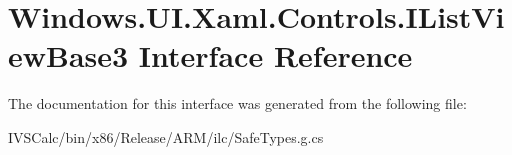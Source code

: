 \hypertarget{interface_windows_1_1_u_i_1_1_xaml_1_1_controls_1_1_i_list_view_base3}{}\section{Windows.\+U\+I.\+Xaml.\+Controls.\+I\+List\+View\+Base3 Interface Reference}
\label{interface_windows_1_1_u_i_1_1_xaml_1_1_controls_1_1_i_list_view_base3}


The documentation for this interface was generated from the following file\+:\begin{DoxyCompactItemize}
\item 
I\+V\+S\+Calc/bin/x86/\+Release/\+A\+R\+M/ilc/Safe\+Types.\+g.\+cs\end{DoxyCompactItemize}
